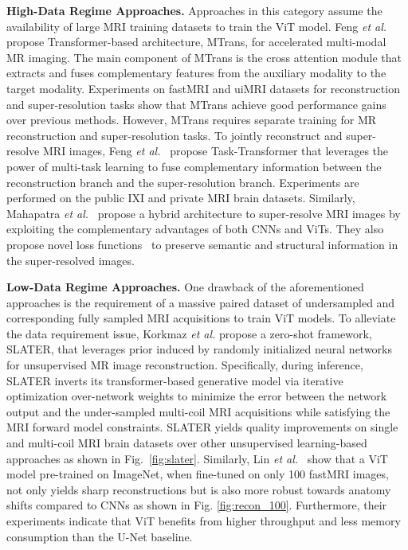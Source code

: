\documentclass[10pt,journal,compsoc]{IEEEtran}
\begin{document}
 {\textbf{High-Data Regime Approaches.}} Approaches in this category assume the availability of large MRI training datasets to train the ViT model.
Feng \textit{et al.}~\cite{feng2021accelerated} propose Transformer-based architecture, MTrans, for accelerated multi-modal MR imaging.
The main component of MTrans is the cross attention module that extracts and fuses complementary features from the auxiliary modality to the target modality. Experiments on fastMRI and uiMRI datasets for reconstruction and super-resolution tasks show that MTrans achieve good performance gains over previous methods.
However, MTrans requires separate training for MR reconstruction and super-resolution tasks. To jointly reconstruct and super-resolve MRI images, Feng \textit{et al.}~\cite{feng2021task} propose Task-Transformer that leverages the power of multi-task learning to fuse complementary information between the reconstruction branch and the super-resolution branch. Experiments are performed on the public IXI and private MRI brain datasets.
Similarly, Mahapatra \textit{et al.}~\cite{mahapatra2021mr} propose a hybrid architecture to super-resolve MRI images by exploiting the complementary advantages of both CNNs and ViTs. They also propose novel loss functions~\cite{park2020swapping} to preserve semantic and structural information
in the super-resolved images.

 {\textbf{Low-Data Regime Approaches.}}
One drawback of the aforementioned approaches is the requirement of a massive paired dataset of undersampled and corresponding fully sampled MRI acquisitions to train ViT models. To alleviate the data requirement issue, Korkmaz \textit{et al.} \cite{korkmaz2021unsupervised,korkmaz2021deep} propose a zero-shot framework, SLATER, that leverages prior induced by randomly initialized neural networks \cite{ulyanov2018deep,qayyum2021untrained} for unsupervised MR image reconstruction. Specifically, during inference, SLATER inverts its transformer-based generative model via iterative optimization over-network weights to minimize the error between the network output and the under-sampled multi-coil MRI acquisitions while satisfying the MRI forward model constraints. SLATER yields quality improvements on single and multi-coil MRI brain datasets over other unsupervised learning-based approaches as shown in Fig.~\ref{fig:slater}.
Similarly, Lin \textit{et al.}~\cite{lin2021vision} show that a ViT model pre-trained on ImageNet, when fine-tuned on only 100 fastMRI images, not only yields sharp reconstructions but is also more robust towards anatomy shifts compared to CNNs as shown in Fig. \ref{fig:recon_100}. Furthermore, their experiments indicate that ViT benefits from higher throughput and less memory consumption than the U-Net baseline.
\end{document}
